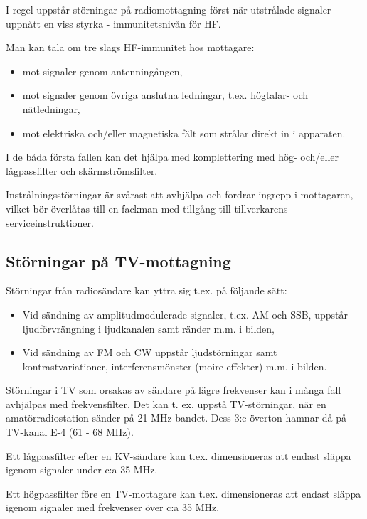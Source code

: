 I regel uppstår störningar på radiomottagning först när utstrålade
signaler uppnått en viss styrka - immunitetsnivån för HF.

Man kan tala om tre slags HF-immunitet hos mottagare:
\begin{itemize}
\item mot signaler genom antenningången,
\item mot signaler genom övriga anslutna ledningar, t.ex. högtalar-
  och nätledningar,
\item mot elektriska och/eller magnetiska fält som strålar direkt in i
  apparaten.
\end{itemize}

I de båda första fallen kan det hjälpa med komplettering med hög-
och/eller lågpassfilter och skärmströmsfilter.

Instrålningsstörningar är svårast att avhjälpa och fordrar ingrepp i
mottagaren, vilket bör överlåtas till en fackman med tillgång till
tillverkarens serviceinstruktioner.

\subsection{Störningar på TV-mottagning}


Störningar från radiosändare kan yttra sig t.ex. på följande sätt:
\begin{itemize}
\item Vid sändning av amplitudmodulerade signaler, t.ex. AM och SSB,
  uppstår ljudförvrängning i ljudkanalen samt ränder m.m. i bilden,
\item Vid sändning av FM och CW uppstår ljudstörningar samt
  kontrastvariationer, interferensmönster (moire-effekter) m.m. i
  bilden.
\end{itemize}

Störningar i TV som orsakas av sändare på lägre frekvenser kan i många
fall avhjälpas med frekvensfilter. Det kan t. ex. uppstå
TV-störningar, när en amatörradiostation sänder på 21 MHz-bandet. Dess
3:e överton hamnar då på TV-kanal E-4 (61 - 68 MHz).

Ett lågpassfilter efter en KV-sändare kan t.ex. dimensioneras att
endast släppa igenom signaler under c:a 35 MHz.

Ett högpassfilter före en TV-mottagare kan t.ex. dimensioneras att
endast släppa igenom signaler med frekvenser över c:a 35 MHz.


